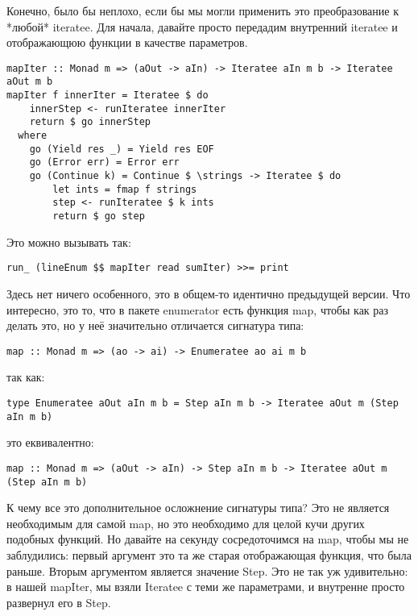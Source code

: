 Конечно, было бы неплохо, если бы мы могли применить это преобразование к *любой* iteratee. Для начала, давайте просто передадим внутренний iteratee и отображающюю функции в качестве параметров.

\begin{lstlisting}
mapIter :: Monad m => (aOut -> aIn) -> Iteratee aIn m b -> Iteratee aOut m b
mapIter f innerIter = Iteratee $ do
    innerStep <- runIteratee innerIter
    return $ go innerStep
  where
    go (Yield res _) = Yield res EOF
    go (Error err) = Error err
    go (Continue k) = Continue $ \strings -> Iteratee $ do
        let ints = fmap f strings
        step <- runIteratee $ k ints
        return $ go step
\end{lstlisting}

Это можно вызывать так:

\begin{lstlisting}
run_ (lineEnum $$ mapIter read sumIter) >>= print
\end{lstlisting}

Здесь нет ничего особенного, это в общем-то идентично предыдущей версии. Что интересно, это то, что в пакете enumerator есть  функция map, чтобы как раз делать это, но у неё значительно отличается сигнатура типа:

\begin{lstlisting}
map :: Monad m => (ao -> ai) -> Enumeratee ao ai m b
\end{lstlisting}

так как:

\begin{lstlisting}
type Enumeratee aOut aIn m b = Step aIn m b -> Iteratee aOut m (Step aIn m b)
\end{lstlisting}

это еквивалентно:

\begin{lstlisting}
map :: Monad m => (aOut -> aIn) -> Step aIn m b -> Iteratee aOut m (Step aIn m b)
\end{lstlisting}

К чему все это дополнительное осложнение сигнатуры типа? Это не является необходимым для самой map, но это необходимо для целой кучи других подобных функций. Но давайте на секунду сосредоточимся на map, чтобы мы не заблудились: первый аргумент это та же старая отображающая функция, что была раньше. Вторым аргументом является значение Step. Это не так уж удивительно: в нашей mapIter, мы взяли Iteratee с теми же параметрами, и внутренне просто развернул его в Step.

